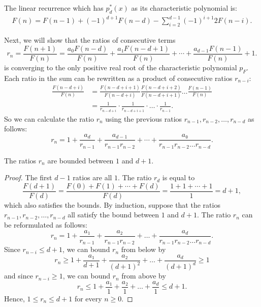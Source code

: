 \begin{example}
  The linear recurrence which has $p_d^*(x)$ as its characteristic polynomial is:
  \begin{align*}
    F(n) = F(n - 1) + (-1)^{d+1} F(n - d) - \sum_{i=2}^{d - 1} (-1)^{i+1} 2 F(n - i).
  \end{align*}
\end{example}

Next, we will show that the ratios of consecutive terms
\[
  r_n = \frac{F(n+1)}{F(n)} = \frac{a_0 F(n - d)}{F(n)} + \frac{a₁ F(n - d + 1)}{F(n)} + ⋯ + \frac{a_{d-1} F(n-1)}{F(n)} + 1.
\]
is converging to the only positive real root of the characteristic polynomial $p_F$.
Each ratio in the sum can be rewritten as a product of consecutive ratios $r_{n-i}$:
\begin{align*}
  \frac{F(n - d + i)}{F(n)}
  & = \frac{F(n - d + i + 1)}{F(n - d + i)} \frac{F(n - d + i + 2)}{F(n - d + i + 1)} \dots \frac{F(n-1)}{F(n)} \\
  & = \frac{1}{r_{n - d + i}} · \frac{1}{r_{n - d + i + 1}} · \dots · \frac{1}{r_{n-1}}.
\end{align*}
So we can calculate the ratio $r_n$ using the previous ratios $r_{n-1}, r_{n-2}, …, r_{n-d}$ as follows:
\[
  r_n = 1 + \frac{a_d}{r_{n-1}} + \frac{a_{d-1}}{r_{n-1} r_{n-2}} + ⋯ + \frac{a₀}{r_{n-1} r_{n-2} \dots r_{n-d}}.
\]


\begin{lemma}
  The ratios $r_n$ are bounded between $1$ and $d+1$.
\end{lemma}

\begin{proof}
  The first $d - 1$ ratios are all $1$.
  The ratio $r_d$ is equal to
  \[
    \frac{F(d+1)}{F(d)} = \frac{F(0) + F(1) + ⋯ + F(d)}{F(d)} = \frac{1 + 1 + ⋯ + 1}{1} = d + 1,
  \]
  which also satisfies the bounds.
  By induction, suppose that the ratios $r_{n-1}, r_{n-2}, …, r_{n-d}$ all satisfy the bound between $1$ and $d+1$.
  The ratio $r_n$ can be reformulated as follows:
  \[
    r_n = 1 + \frac{a₁}{r_{n-1}} + \frac{a₂}{r_{n-1} r_{n-2}} + \dots + \frac{a_d}{r_{n-1} r_{n-2} \dots r_{n-d}}.
  \]
  Since $r_{n-i} ≤ d+1$, we can bound $r_n$ from below by
  \[
    r_n ≥ 1 + \frac{a₁}{d+1} + \frac{a₂}{(d+1)^2} + \dots + \frac{a_d}{(d+1)^d} ≥ 1
  \]
  and since $r_{n-i} ≥ 1$, we can bound $r_n$ from above by
  \[
    r_n ≤ 1 + \frac{a₁}{1} + \frac{a₂}{1} + \dots + \frac{a_d}{1} ≤ d+1.
  \]
  Hence, $1 ≤ r_n ≤ d+1$ for every $n ≥ 0$.
\end{proof}

